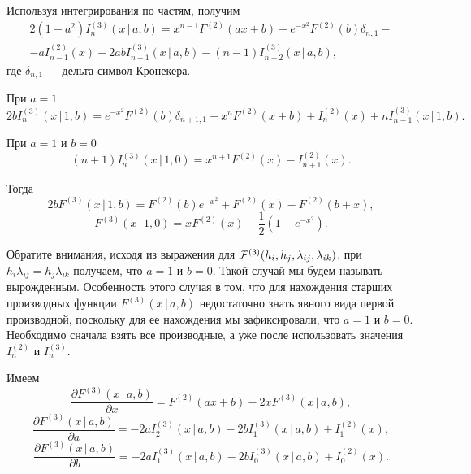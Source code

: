 \documentclass[12pt]{article}
\def\FV{F^{(2)}}
\def\FW{F^{(3)}}
\def\cFW{{\cal F}^{(3)}}
\begin{document}
Используя интегрирования по частям, получим
\begin{multline}
    2 (1-a^{2}) I^{(3)}_n(x \, | \, a, b) = x^{n-1}\FV\left(a x + b\right) - e^{-x^2}\FV(b)\delta_{n, 1} -\\- aI^{(2)}_{n-1}(x) + 2abI^{(3)}_{n-1}(x \, | \, a, b) - (n-1)I^{(3)}_{n-2}(x \, | \, a, b),
\end{multline}
где $\delta_{n, 1}$ --- дельта-символ Кронекера.

При $a = 1$
\begin{equation}
    2bI^{(3)}_{n}(x \, | \, 1, b) = e^{-x^2}\FV(b)\delta_{n+1, 1} - x^{n}\FV\left(x + b\right) + I^{(2)}_{n}(x) + nI^{(3)}_{n-1}(x \, | \, 1, b).
\end{equation}

При $a = 1$ и $b = 0$
\begin{equation}
    (n+1)I^{(3)}_{n}(x \, | \, 1, 0) = x^{n+1}\FV(x)-I^{(2)}_{n+1}(x).
\end{equation}

Тогда
\begin{equation}
    2b\FW(x \, | \, 1, b) = F^{(2)}\left(b\right) e^{- x^{2}} + F^{(2)}\left(x\right) - F^{(2)}\left(b + x\right), 
\end{equation}
\begin{equation}
    \FW(x \, | \, 1, 0) = x\FV(x) - \frac{1}{2}\left(1-e^{-x^2}\right).
\end{equation}

Обратите внимания, исходя из выражения для $\cFW(h_i, h_j, \lambda_{ij}, \lambda_{ik})$, при $h_i\lambda_{ij} = h_j\lambda_{ik}$ получаем, что $a = 1$ и $b = 0$. Такой случай мы будем называть вырожденным. Особенность этого случая в том, что для нахождения старших производных функции $\FW(x \, | \, a, b)$ недостаточно знать явного вида первой производной, поскольку для ее нахождения мы зафиксировали, что $a = 1$ и $b = 0$. Необходимо сначала взять все производные, а уже после использовать значения $I^{(2)}_n$ и $I^{(3)}_n$.

Имеем
\begin{equation}
    \frac{\partial \FW(x \, | \, a, b)}{\partial x} = \FV(ax+b)-2x\FW(x \, | \, a, b),
\end{equation}
\begin{equation}
    \frac{\partial \FW(x \, | \, a, b)}{\partial a}  = - 2 a I^{(3)}_{2}(x \, | \, a, b) - 2 b I^{(3)}_{1}(x \, | \, a, b) + I^{(2)}_{1}(x),
\end{equation}
\begin{equation}
    \frac{\partial \FW(x \, | \, a, b)}{\partial b} = - 2 a I^{(3)}_{1}(x \, | \, a, b) - 2 b I^{(3)}_{0}(x \, | \, a, b) + I^{(2)}_{0}(x).
\end{equation}
\end{document}
